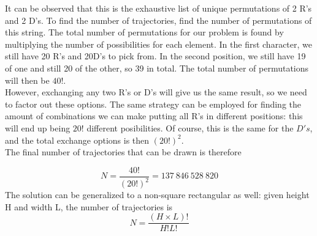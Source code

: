 \documentclass[10pt,a4paper]{article}
\begin{document}
It can be observed that this is the exhaustive list of unique permutations of 2 R's and 2 D's. To find the number of trajectories, find the number of permutations of this string. The total number of permutations for our problem is found by multiplying the number of possibilities for each element. In the first character, we still have 20 R's and 20D's to pick from. In the second position, we still have 19 of one and still 20 of the other, so 39 in total.  The total number of permutations will then be $40!$.\\
However, exchanging any two R's or D's will give us the same result, so we need to factor out these options. The same strategy can be employed for finding the amount of combinations we can make putting all R's in different positions: this will end up being $20!$ different posibilities. Of course, this is the same for the $D's$, and the total exchange options is then $\left(20!\right)^2$.\\
The final number of trajectories that can be drawn is therefore

\begin{equation}
	\boxed{N = \frac{40!}{\left(20!\right)^2} = 137\ 846\ 528\ 820}
\end{equation}
The solution can be generalized to a non-square rectangular as well: given height H and width L, the number of trajectories is 
\begin{equation}
	\boxed{N = \frac{\left(H \times L\right)!}{H!L!}}
\end{equation}
\end{document}
